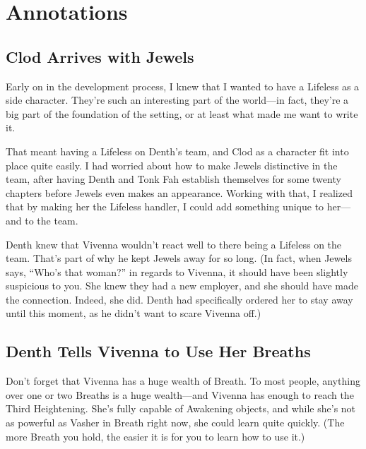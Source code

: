 \section*{Annotations}

\subsection*{Clod Arrives with Jewels}

Early on in the development process, I knew that I wanted to have a Lifeless as a side character. They’re such an interesting part of the world—in fact, they’re a big part of the foundation of the setting, or at least what made me want to write it.

That meant having a Lifeless on Denth’s team, and Clod as a character fit into place quite easily. I had worried about how to make Jewels distinctive in the team, after having Denth and Tonk Fah establish themselves for some twenty chapters before Jewels even makes an appearance. Working with that, I realized that by making her the Lifeless handler, I could add something unique to her—and to the team.

Denth knew that Vivenna wouldn’t react well to there being a Lifeless on the team. That’s part of why he kept Jewels away for so long. (In fact, when Jewels says, “Who’s that woman?” in regards to Vivenna, it should have been slightly suspicious to you. She knew they had a new employer, and she should have made the connection. Indeed, she did. Denth had specifically ordered her to stay away until this moment, as he didn’t want to scare Vivenna off.)

\subsection*{Denth Tells Vivenna to Use Her Breaths}

Don’t forget that Vivenna has a huge wealth of Breath. To most people, anything over one or two Breaths is a huge wealth—and Vivenna has enough to reach the Third Heightening. She’s fully capable of Awakening objects, and while she’s not as powerful as Vasher in Breath right now, she could learn quite quickly. (The more Breath you hold, the easier it is for you to learn how to use it.)

